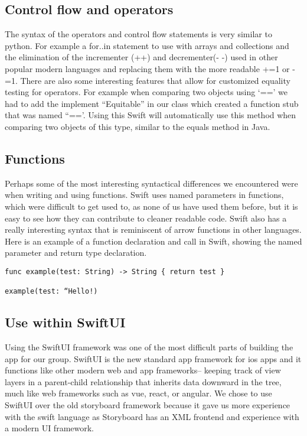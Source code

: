 \documentclass{article}
\begin{document}
\subsection{Control flow and operators}
The syntax of the operators and control flow statements is very similar to python.  For example a for..in statement to use with arrays and collections and the elimination of the incrementer (++) and decrementer(- -) used in other popular modern languages and replacing them with the more readable +=1 or -=1. There are also some interesting features that allow for customized equality testing for operators. For example when comparing two objects using ‘==’ we had to add the implement “Equitable” in our class which created a function stub that was named “==’. Using this Swift will automatically use this method when comparing two objects of this type, similar to the equals method in Java.

\subsection{Functions}
Perhaps some of the most interesting syntactical differences we encountered were when writing and using functions. Swift uses named parameters in functions, which were difficult to get used to, as none of us have used them before, but it is easy to see how they can contribute to cleaner readable code. Swift also has a really interesting syntax that is reminiscent of arrow functions in other languages. Here is an example of a function declaration and call in Swift, showing the named parameter and return type declaration. 

\begin{verbatim} 
func example(test: String) -> String { return test }
 
example(test: “Hello!)
\end{verbatim}

\subsection{Use within SwiftUI}
Using the SwiftUI framework was one of the most difficult parts of building the app for our group. SwiftUI is the new standard app framework for ios apps and it functions like other modern web and app frameworks-- keeping track of view layers in a parent-child relationship that inherits data downward in the tree, much like web frameworks such as vue, react, or angular. We chose to use SwiftUI over the old storyboard framework because it gave us more experience with the swift language as Storyboard has an XML frontend and experience with a modern UI framework. \par
\end{document}
